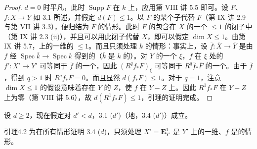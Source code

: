 \begin{proof}
$d=0$ 时平凡，此时 $\operatorname{Supp}F$ 在 $k$ 上，应用第 VIII 讲 5.5 即可。设 $F$、$f:X\to Y$ 如 3.1 所述，并假定 $d(F)\leq1$。以 $F$ 的某个子代替 $F$（第 IX 讲 2.9 与第 VII 讲 3.3），便归结为 $F$ 的情形。此时 $F$ 的包含在 $X$ 的一个 $\leq1$ 的闭子中（第 IX 讲 2.3 (ii)），并且可以用此闭子代替 $X$，即可以假定 $\dim X\leq1$。由第 IX 讲 5.7，上的一维的 $\leq1$。而且只须处理 $k$ 的情形：事实上，设 $\overline f:\overline X\to\overline Y$ 是由 $f$ 经 $\operatorname{Spec}\bar k\to\operatorname{Spec}k$ 得到的（$\bar k$ 是 $k$ 的）。对 $Y$ 的一个 $\xi$，$f$ 在 $\xi$ 处的 $f':X'\to Y'$ 可等同于 $\overline f$ 的一个，因此 $(R^qf_*F)_\xi$ 可等同于 $R^q\overline f_*\overline F$ 的一个。由于 $\overline f$ ，得到 $q>1$ 时 $R^qf_*F=0$。而且显然 $d(f_*F)\leq1$。对于 $q=1$，注意 $\dim X\leq1$ 的假设意味着存在 $Y$ 的 $Z$，使 $f$ 在 $Y-Z$ 上。因此 $R^1f_*F$ 在 $Y-Z$ 上为零（第 VIII 讲 5.6），故 $d(R^1f_*F)\leq1$，引理的证明完成。
\end{proof}
设 $d\geq2$，现在假定对 $d'<d$，3.1 ($d'$)（地，3.4 ($d'$)）成立。
\begin{SGAresult}{引理}{4.2}
为在所有情形证明 3.4 ($d$)，只须处理 $X'=\mathbf E_{Y'}^1$ 是 $Y'$ 上的一维、$f$ 是的情形。
\end{SGAresult}
